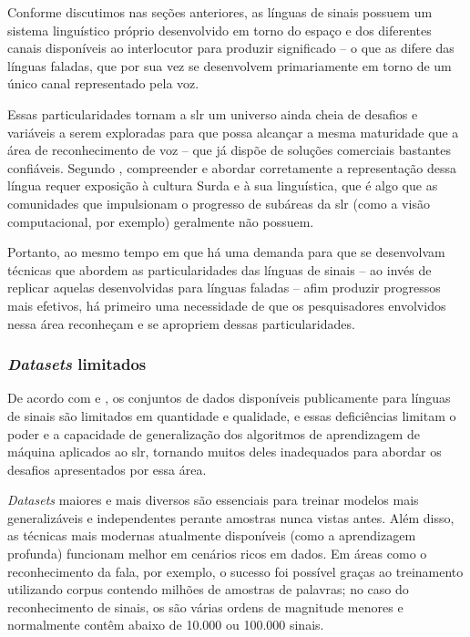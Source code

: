 Conforme discutimos nas seções anteriores, as línguas de sinais possuem um sistema linguístico próprio desenvolvido em torno do espaço e dos diferentes canais disponíveis ao interlocutor para produzir significado -- o que as difere das línguas faladas, que por sua vez se desenvolvem primariamente em torno de um único canal representado pela voz.

Essas particularidades tornam a \acrshort{slr} um universo ainda cheia de desafios e variáveis a serem exploradas para que possa alcançar a mesma maturidade que a área de reconhecimento de voz -- que já dispõe de soluções comerciais bastantes confiáveis. Segundo , compreender e abordar corretamente a representação dessa língua requer exposição à cultura Surda e à sua linguística, que é algo que as comunidades que impulsionam o progresso de subáreas da \acrshort{slr} (como a visão computacional, por exemplo) geralmente não possuem.

Portanto, ao mesmo tempo em que há uma demanda para que se desenvolvam técnicas que abordem as particularidades das línguas de sinais -- ao invés de replicar aquelas desenvolvidas para línguas faladas -- afim produzir progressos mais efetivos, há primeiro  uma necessidade de que os pesquisadores envolvidos nessa área reconheçam e se apropriem dessas particularidades.



\subsubsection{\textit{Datasets} limitados}
\label{sec:slr-desafios-datasets-limitados}

De acordo com  e , os conjuntos de dados disponíveis publicamente para línguas de sinais são limitados em quantidade e qualidade, e essas deficiências limitam o poder e a capacidade de generalização dos algoritmos de aprendizagem de máquina aplicados ao \acrshort{slr}, tornando muitos deles inadequados para abordar os desafios apresentados por essa área. 

\textit{Datasets} maiores e mais diversos são essenciais para treinar modelos mais generalizáveis e independentes perante amostras nunca vistas antes. Além disso, as técnicas mais modernas atualmente disponíveis (como a aprendizagem profunda) funcionam melhor em cenários ricos em dados. Em áreas como o reconhecimento da fala, por exemplo, o sucesso foi possível graças ao treinamento utilizando corpus contendo milhões de amostras de palavras; no caso do reconhecimento de sinais, os \datasets são várias ordens de magnitude menores e normalmente contêm abaixo de 10.000 ou 100.000 sinais.

